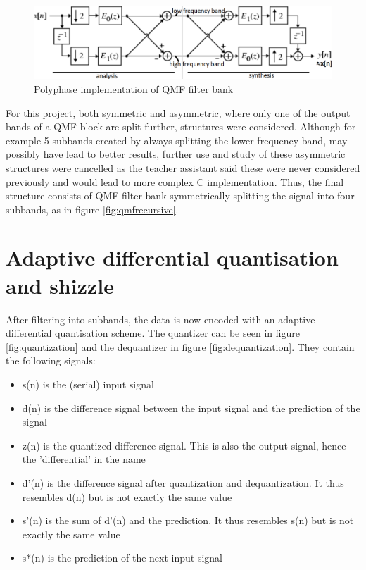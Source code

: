 \documentclass[a4paper]{article}
\begin{document}
\begin{figure}[hbt]
\includegraphics[width = \textwidth]{qmf}
\caption{Polyphase implementation of QMF filter bank}
\label{fig:qmf}
\end{figure}

For this project, both symmetric and asymmetric, where only one of the output bands of a QMF block are split further, structures were considered. Although for example 5 subbands created by always splitting the lower frequency band, may possibly have lead to better results, further use and study of these asymmetric structures were cancelled as the teacher assistant said these were never considered previously and would lead to more complex C implementation. Thus, the final structure consists of QMF filter bank symmetrically splitting the signal into four subbands, as in figure \ref{fig:qmfrecursive}.

\section{Adaptive differential quantisation and shizzle}
After filtering into subbands, the data is now encoded with an adaptive differential quantisation scheme. The quantizer can be seen in figure \ref{fig:quantization} and the dequantizer in figure \ref{fig:dequantization}. They contain the following signals:

\begin{itemize}
\item s(n) is the (serial) input signal
\item d(n) is the difference signal between the input signal and the prediction of the signal
\item z(n) is the quantized difference signal. This is also the output signal, hence the 'differential' in the name
\item d'(n) is the difference signal after quantization and dequantization. It thus resembles d(n) but is not exactly the same value
\item s'(n) is the sum of d'(n) and the prediction. It thus resembles s(n) but is not exactly the same value
\item s*(n) is the prediction of the next input signal 
\end{itemize}
\end{document}
